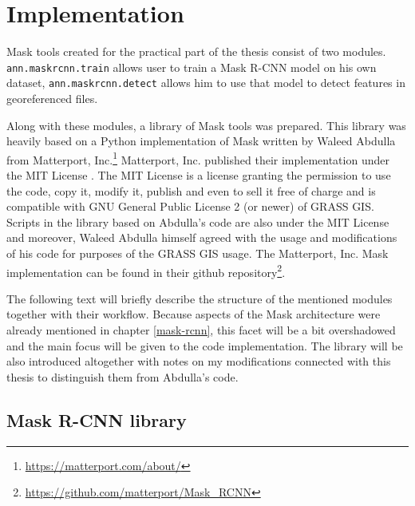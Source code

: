 \chapter{Implementation}
\label{implementation}

Mask  tools created for the practical part of the thesis consist of two modules. \verb|ann.maskrcnn.train| allows user to train a Mask R-CNN model on his own dataset, \verb|ann.maskrcnn.detect| allows him to use that model to detect features in georeferenced files. 

Along with these modules, a library of Mask  tools was prepared. This library was heavily based on a Python implementation of Mask  written by Waleed Abdulla from Matterport, Inc.\footnote{\url{https://matterport.com/about/}}  Matterport, Inc. published their implementation under the MIT License \cite{mit}. The MIT License is a license granting the permission to use the code, copy it, modify it, publish and even to sell it free of charge and is compatible with GNU General Public License 2 (or newer) \cite{gplv2} of GRASS GIS. Scripts in the library based on Abdulla's code are also under the MIT License and moreover, Waleed Abdulla himself agreed with the usage and modifications of his code for purposes of the GRASS GIS usage. The Matterport, Inc. Mask  implementation can be found in their github repository\footnote{\url{https://github.com/matterport/Mask\_RCNN}}.


The following text will briefly describe the structure of the mentioned modules together with their workflow. Because aspects of the Mask  architecture were already mentioned in chapter \ref{mask-rcnn}, this facet will be a bit overshadowed and the main focus will be given to the code implementation. The library will be also introduced altogether with notes on my modifications connected with this thesis to distinguish them from Abdulla's code.

\section{Mask R-CNN library}
\label{library}

